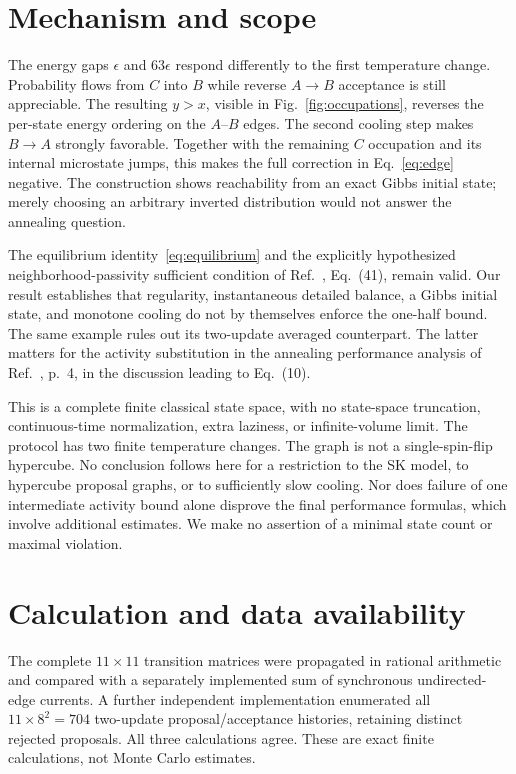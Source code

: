 \documentclass[aps,pre,reprint,longbibliography,nofootinbib,floatfix]{revtex4-2}
\newcommand{\eps}{\epsilon}
\begin{document}
\section{Mechanism and scope}
The energy gaps $\eps$ and $63\eps$ respond differently to the first
temperature change. Probability flows from $C$ into $B$ while reverse
$A\to B$ acceptance is still appreciable. The resulting $y>x$, visible in
Fig.~\ref{fig:occupations}, reverses the per-state energy ordering on the
$A$--$B$ edges. The second cooling step makes $B\to A$ strongly favorable.
Together with the remaining $C$ occupation and its internal microstate
jumps, this makes the full correction in Eq.~\eqref{eq:edge} negative.
The construction shows reachability from an exact Gibbs initial state;
merely choosing an arbitrary inverted distribution would not answer the
annealing question.

The equilibrium identity~\eqref{eq:equilibrium} and the explicitly
hypothesized neighborhood-passivity sufficient condition of
Ref.~\cite{LuoDetailed}, Eq.~(41), remain valid. Our result establishes
that regularity, instantaneous detailed balance, a Gibbs initial state,
and monotone cooling do not by themselves enforce the one-half bound.
The same example rules out its two-update averaged counterpart.
The latter matters for the activity substitution in the annealing
performance analysis of Ref.~\cite{LuoLetter}, p.~4, in the discussion
leading to Eq.~(10).

This is a complete finite classical state space, with no state-space
truncation, continuous-time normalization, extra laziness, or infinite-volume
limit. The protocol has two finite temperature changes. The graph is not
a single-spin-flip hypercube. No conclusion follows here for a restriction
to the SK model, to hypercube proposal graphs, or to sufficiently slow
cooling. Nor does failure of one intermediate activity bound alone disprove
the final performance formulas, which involve additional estimates.
We make no assertion of a minimal state count or maximal violation.

\section{Calculation and data availability}
The complete $11\times11$ transition matrices were propagated in rational
arithmetic and compared with a separately implemented sum of synchronous
undirected-edge currents. A further independent implementation enumerated
all $11\times8^2=704$ two-update proposal/acceptance histories, retaining
distinct rejected proposals. All three calculations agree. These are exact
finite calculations, not Monte Carlo estimates.
\end{document}
